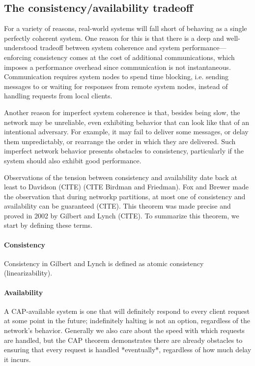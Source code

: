 \subsection{The consistency/availability tradeoff}


For a variety of reasons, real-world systems will fall short of
behaving as a single perfectly coherent system. One reason for this is
that there is a deep and well-understood tradeoff between system
coherence and system performance---enforcing consistency comes at the
cost of additional communications, which imposes a performance
overhead since communication is not instantaneous. Communication
requires system nodes to spend time blocking, i.e. sending messages to
or waiting for responses from remote system nodes, instead of handling
requests from local clients.

Another reason for imperfect system coherence is that, besides being
slow, the network may be unreliable, even exhibiting behavior that can
look like that of an intentional adversary. For example, it may fail
to deliver some messages, or delay them unpredictably, or rearrange
the order in which they are delivered. Such imperfect network behavior
presents obstacles to consistency, particularly if the system should
also exhibit good performance.

Observations of the tension between consistency and availability date
back at least to Davidson (CITE) (CITE Birdman and Friedman). Fox and
Brewer made the observation that during networkp partitions, at most
one of consistency and availability can be guaranteed (CITE). This
theorem was made precise and proved in 2002 by Gilbert and Lynch
(CITE). To summarize this theorem, we start by defining these terms.

\paragraph{Consistency}

Consistency in Gilbert and Lynch is defined as atomic consistency
(linearizability).

\paragraph{Availability}

A CAP-available system is one that will definitely respond to every
client request at some point in the future; indefinitely halting is
not an option, regardless of the network's behavior. Generally we also
care about the speed with which requests are handled, but the CAP
theorem demonstrates there are already obstacles to ensuring that
every request is handled *eventually*, regardless of how much delay it
incurs.

